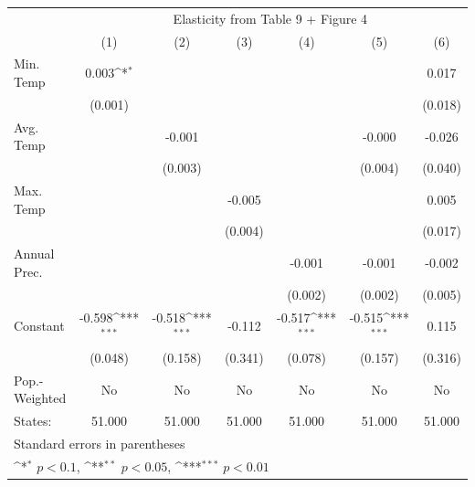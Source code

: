 {
\def\sym#1{\ifmmode^{#1}\else\(^{#1}\)\fi}
\begin{tabular}{l*{6}{c}}
\hline\hline
            &\multicolumn{6}{c}{Elasticity from Table 9 + Figure 4}                                                                             \\
            &\multicolumn{1}{c}{(1)}         &\multicolumn{1}{c}{(2)}         &\multicolumn{1}{c}{(3)}         &\multicolumn{1}{c}{(4)}         &\multicolumn{1}{c}{(5)}         &\multicolumn{1}{c}{(6)}         \\
\hline
Min. Temp   &       0.003\sym{*}  &                     &                     &                     &                     &       0.017         \\
            &     (0.001)         &                     &                     &                     &                     &     (0.018)         \\
[1em]
Avg. Temp   &                     &      -0.001         &                     &                     &      -0.000         &      -0.026         \\
            &                     &     (0.003)         &                     &                     &     (0.004)         &     (0.040)         \\
[1em]
Max. Temp   &                     &                     &      -0.005         &                     &                     &       0.005         \\
            &                     &                     &     (0.004)         &                     &                     &     (0.017)         \\
[1em]
Annual Prec.&                     &                     &                     &      -0.001         &      -0.001         &      -0.002         \\
            &                     &                     &                     &     (0.002)         &     (0.002)         &     (0.005)         \\
[1em]
Constant    &      -0.598\sym{***}&      -0.518\sym{***}&      -0.112         &      -0.517\sym{***}&      -0.515\sym{***}&       0.115         \\
            &     (0.048)         &     (0.158)         &     (0.341)         &     (0.078)         &     (0.157)         &     (0.316)         \\
\hline
Pop.-Weighted&          No         &          No         &          No         &          No         &          No         &          No         \\
States:     &      51.000         &      51.000         &      51.000         &      51.000         &      51.000         &      51.000         \\
\hline\hline
\multicolumn{7}{l}{\footnotesize Standard errors in parentheses}\\
\multicolumn{7}{l}{\footnotesize \sym{*} \(p<0.1\), \sym{**} \(p<0.05\), \sym{***} \(p<0.01\)}\\
\end{tabular}
}
